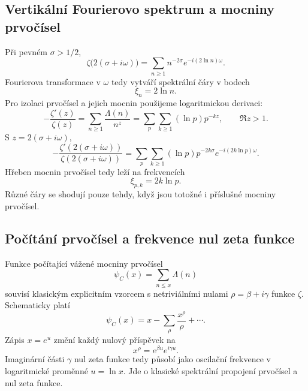 \subsection{Vertikální Fourierovo spektrum a mocniny prvočísel}

Při pevném $\sigma>1/2$,
\begin{equation}
 \zeta\bigl(2(\sigma+i\omega)\bigr)
 =\sum_{n\ge1}n^{-2\sigma}e^{-i(2\ln n)\omega}.
 \label{eq:zeta-vertical-fourier}
\end{equation}
Fourierova transformace v $\omega$ tedy vytváří spektrální čáry v bodech
\begin{equation}
 \xi_n=2\ln n.
\end{equation}
Pro izolaci prvočísel a jejich mocnin použijeme logaritmickou derivaci:
\begin{equation}
 -\frac{\zeta'(z)}{\zeta(z)}
 =\sum_{n\ge1}\frac{\Lambda(n)}{n^z}
 =\sum_p\sum_{k\ge1}(\ln p)p^{-kz},
 \qquad \Re z>1.
 \label{eq:log-derivative-von-mangoldt}
\end{equation}
S $z=2(\sigma+i\omega)$,
\begin{equation}
 -\frac{\zeta'\!\left(2(\sigma+i\omega)\right)}
        {\zeta\!\left(2(\sigma+i\omega)\right)}
 =\sum_p\sum_{k\ge1}
   (\ln p)p^{-2k\sigma}
   e^{-i(2k\ln p)\omega}.
 \label{eq:prime-power-fourier-comb}
\end{equation}
Hřeben mocnin prvočísel tedy leží na frekvencích
\begin{equation}
 \boxed{\xi_{p,k}=2k\ln p.}
 \label{eq:prime-power-frequencies}
\end{equation}
Různé čáry se shodují pouze tehdy, když jsou totožné i příslušné mocniny
prvočísel.

\subsection{Počítání prvočísel a frekvence nul zeta funkce}

Funkce počítající vážené mocniny prvočísel
\begin{equation}
 \psi_C(x)=\sum_{n\le x}\Lambda(n)
\end{equation}
souvisí klasickým explicitním vzorcem s netriviálními nulami
$\rho=\beta+i\gamma$ funkce $\zeta$. Schematicky platí
\begin{equation}
 \psi_C(x)=x-\sum_\rho\frac{x^\rho}{\rho}+\cdots.
 \label{eq:explicit-formula-schematic}
\end{equation}
Zápis $x=e^u$ změní každý nulový příspěvek na
\begin{equation}
 x^\rho=e^{\beta u}e^{i\gamma u}.
\end{equation}
Imaginární části $\gamma$ nul zeta funkce tedy působí jako oscilační frekvence
v logaritmické proměnné $u=\ln x$. Jde o klasické spektrální propojení
prvočísel a nul zeta funkce.

